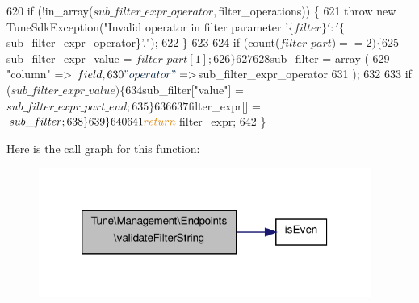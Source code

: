 \begin{DoxyCode}
620             \textcolor{keywordflow}{if} (!in\_array($sub\_filter\_expr\_operator, $filter\_operations)) \{
621                 \textcolor{keywordflow}{throw} \textcolor{keyword}{new} TuneSdkException(\textcolor{stringliteral}{"Invalid operator in filter parameter '\{$filter\}':
       '\{$sub\_filter\_expr\_operator\}'."});
622             \}
623 
624             \textcolor{keywordflow}{if} (count($filter\_part) == 2) \{
625                 $sub\_filter\_expr\_value =  $filter\_part[1];
626             \}
627 
628             $sub\_filter = array (
629                 \textcolor{stringliteral}{"column"} => $field,
630                 \textcolor{stringliteral}{"operator"} => $sub\_filter\_expr\_operator
631             );
632 
633             \textcolor{keywordflow}{if} ($sub\_filter\_expr\_value) \{
634                 $sub\_filter[\textcolor{stringliteral}{"value"}] = $sub\_filter\_expr\_part\_end;
635             \}
636 
637             $filter\_expr[] = $sub\_filter;
638         \}
639     \}
640 
641     \textcolor{keywordflow}{return} $filter\_expr;
642 \}
\end{DoxyCode}


Here is the call graph for this function\-:
\nopagebreak
\begin{figure}[H]
\begin{center}
\leavevmode
\includegraphics[width=308pt]{namespaceTune_1_1Management_1_1Endpoints_a8a3f8f7bc986da92a05b19f9ca804e2d_cgraph}
\end{center}
\end{figure}




